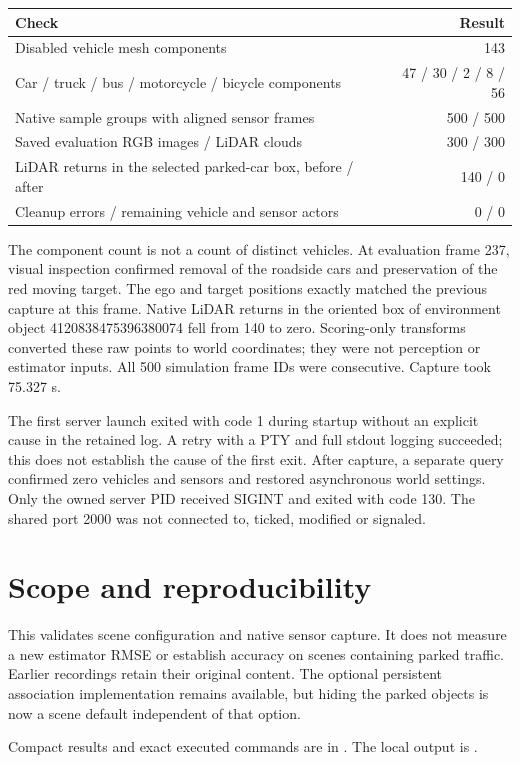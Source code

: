 \documentclass[11pt]{article}
\begin{document}
\begin{center}
\begin{tabular}{@{}lr@{}}
\toprule
Check & Result \\
\midrule
Disabled vehicle mesh components & 143 \\
Car / truck / bus / motorcycle / bicycle components & 47 / 30 / 2 / 8 / 56 \\
Native sample groups with aligned sensor frames & 500 / 500 \\
Saved evaluation RGB images / LiDAR clouds & 300 / 300 \\
LiDAR returns in the selected parked-car box, before / after & 140 / 0 \\
Cleanup errors / remaining vehicle and sensor actors & 0 / 0 \\
\bottomrule
\end{tabular}
\end{center}

The component count is not a count of distinct vehicles. At evaluation
frame 237, visual inspection confirmed removal of the roadside cars and
preservation of the red moving target. The ego and target positions exactly
matched the previous capture at this frame. Native LiDAR returns in the
oriented box of environment object 4120838475396380074 fell from 140 to zero.
Scoring-only transforms converted these raw points to world coordinates;
they were not perception or estimator inputs. All 500 simulation frame IDs
were consecutive. Capture took 75.327 s.

The first server launch exited with code 1 during startup without an explicit
cause in the retained log. A retry with a PTY and full stdout logging
succeeded; this does not establish the cause of the first exit. After capture,
a separate query confirmed zero vehicles and sensors and restored asynchronous
world settings. Only the owned server PID received SIGINT and exited with code
130. The shared port 2000 was not connected to, ticked, modified or signaled.

\section{Scope and reproducibility}
This validates scene configuration and native sensor capture. It does not
measure a new estimator RMSE or establish accuracy on scenes containing
parked traffic. Earlier recordings retain their original content. The
optional persistent association implementation remains available, but hiding
the parked objects is now a scene default independent of that option.

Compact results and exact executed commands are in
.
The local output is
.
\end{document}
